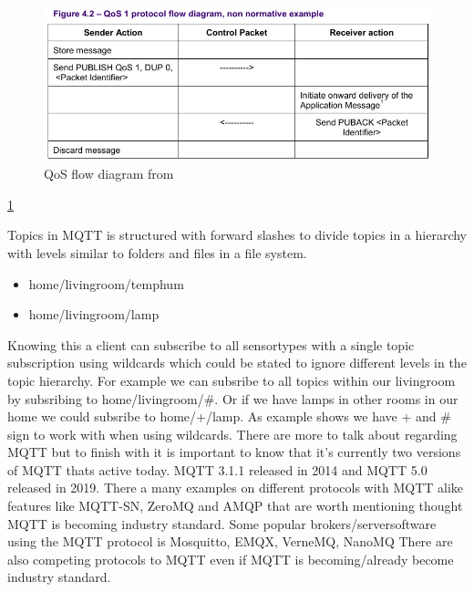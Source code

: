 \documentclass[article,a4paper]{IEEEtran}
\begin{document}
    \begin{figure}
        \includegraphics[width=\columnwidth]{QoS1.png} 
        \caption{QoS flow diagram from \cite{mqtt3.1.1}}
        \label{fig2:QoS1 flow diagram}   
    \end{figure}
    \ref{fig2:QoS1 flow diagram} 
    
    Topics in MQTT \cite{mqtt3.1.1} is structured with forward slashes to divide topics in a hierarchy with levels similar to folders and files in a file system.
    \begin{itemize}
        \item home/livingroom/temphum
        \item home/livingroom/lamp
    \end{itemize} 
    Knowing this a client can subscribe to all sensortypes with a single topic subscription using wildcards which could be stated to ignore different levels in the topic hierarchy. For example we can subsribe to all topics within our livingroom by subsribing to home/livingroom/\#. Or if we have lamps in other rooms in our home we could subsribe to home/+/lamp. As example shows we have + and \# sign to work with when using wildcards. There are more to talk about regarding MQTT but to finish with it is important to know that it's currently two versions of MQTT thats active today. MQTT 3.1.1 released in 2014 and MQTT 5.0 released in 2019. There a many examples on different protocols with MQTT alike features like MQTT-SN, ZeroMQ and AMQP that are worth mentioning thought MQTT is becoming industry standard. Some popular brokers/serversoftware using the MQTT protocol is Mosquitto, EMQX, VerneMQ, NanoMQ \cite{PopularMQTTprotocol}  There are also competing protocols to MQTT even if MQTT is becoming/already become industry standard.
\end{document}
